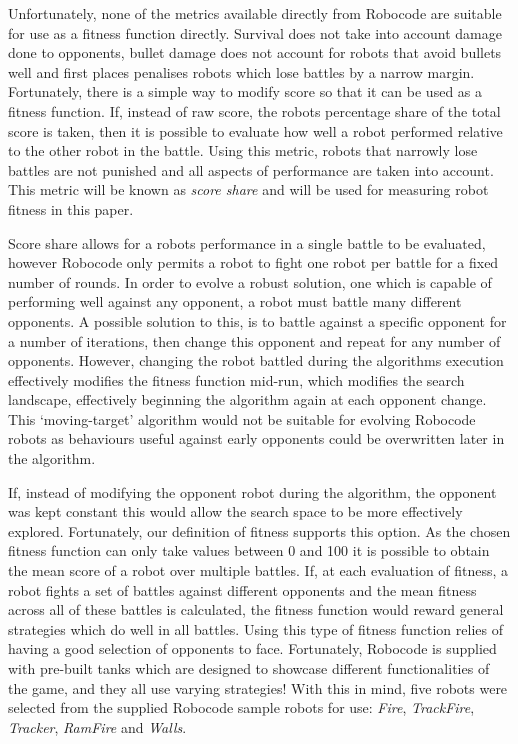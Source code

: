 \documentclass[a4paper, 12pt]{article}
\begin{document}
Unfortunately, none of the metrics available directly from Robocode are suitable for use as a fitness function directly. Survival does not take into account damage done to opponents, bullet damage does not account for robots that avoid bullets well and first places penalises robots which lose battles by a narrow margin. Fortunately, there is a simple way to modify score so that it can be used as a fitness function. If, instead of raw score, the robots percentage share of the total score is taken, then it is possible to evaluate how well a robot performed relative to the other robot in the battle. Using this metric, robots that narrowly lose battles are not punished and all aspects of performance are taken into account. This metric will be known as \textit{score share} and will be used for measuring robot fitness in this paper.

Score share allows for a robots performance in a single battle to be evaluated, however Robocode only permits a robot to fight one robot per battle for a fixed number of rounds. In order to evolve a robust solution, one which is capable of performing well against any opponent, a robot must battle many different opponents. A possible solution to this, is to battle against a specific opponent for a number of iterations, then change this opponent and repeat for any number of opponents. However, changing the robot battled during the algorithms execution effectively modifies the fitness function mid-run, which modifies the search landscape, effectively beginning the algorithm again at each opponent change. This `moving-target' algorithm would not be suitable for evolving Robocode robots as behaviours useful against early opponents could be overwritten later in the algorithm. 

If, instead of modifying the opponent robot during the algorithm, the opponent was kept constant this would allow the search space to be more effectively explored. Fortunately, our definition of fitness supports this option. As the chosen fitness function can only take values between 0 and 100 it is possible to obtain the mean score of a robot over multiple battles. If, at each evaluation of fitness, a robot fights a set of battles against different opponents and the mean fitness across all of these battles is calculated, the fitness function would reward general strategies which do well in all battles. Using this type of fitness function relies of having a good selection of opponents to face. Fortunately, Robocode is supplied with pre-built tanks which are designed to showcase different functionalities of the game, and they all use varying strategies! With this in mind, five robots were selected from the supplied Robocode sample robots for use: \textit{Fire}, \textit{TrackFire}, \textit{Tracker}, \textit{RamFire} and \textit{Walls}.
\end{document}
